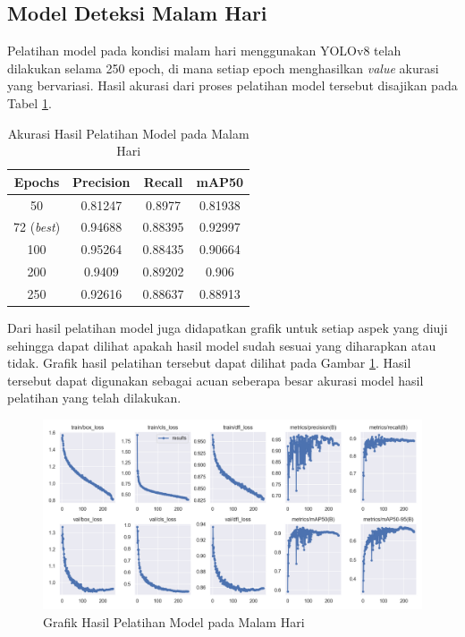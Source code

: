 \subsection{Model Deteksi Malam Hari}
Pelatihan model pada kondisi malam hari menggunakan YOLOv8 telah dilakukan selama 250 epoch, di mana setiap epoch menghasilkan \emph{value} akurasi yang bervariasi. Hasil akurasi dari proses pelatihan model tersebut disajikan pada Tabel \ref{table:akurasi model malam}.
\begin{table}[H]
	\caption{Akurasi Hasil Pelatihan Model pada Malam Hari}
    \label{table:akurasi model malam}
	\centering
	\begin{tabular}{|c|c|c|c|}
		\hline
		Epochs & Precision & Recall & mAP50 \\ \hline
		50 & 0.81247 & 0.8977 & 0.81938 \\ \hline
        72 (\emph{best}) & 0.94688 & 0.88395 & 0.92997 \\ \hline
		100 & 0.95264 & 0.88435 & 0.90664 \\ \hline
		200 & 0.9409 & 0.89202 & 0.906 \\ \hline
		250 & 0.92616 & 0.88637 & 0.88913 \\ \hline
	\end{tabular}
\end{table}

Dari hasil pelatihan model juga didapatkan grafik untuk setiap aspek yang diuji sehingga dapat dilihat apakah hasil model sudah sesuai yang diharapkan atau tidak. Grafik hasil pelatihan tersebut dapat dilihat pada Gambar \ref{fig:grafik model malam}. Hasil tersebut dapat digunakan sebagai acuan seberapa besar akurasi model hasil pelatihan yang telah dilakukan.

\begin{figure} [H] \centering
  \includegraphics[scale=0.5]{bab4/grafik_model_malam.png}
  \caption{Grafik Hasil Pelatihan Model pada Malam Hari}
  \label{fig:grafik model malam}
\end{figure}

